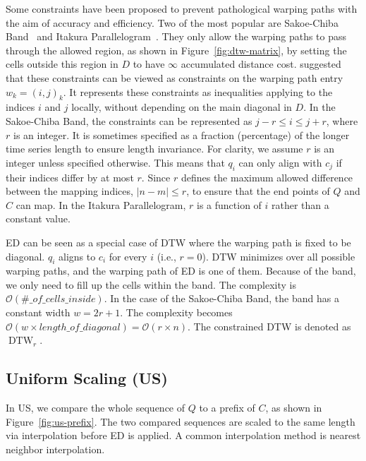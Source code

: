 
Some constraints have been proposed to prevent pathological warping paths with the aim of accuracy and efficiency.
Two of the most popular are Sakoe-Chiba Band~\cite{sakoe1978dynamic} and Itakura Parallelogram~\cite{itakura1975minimum}.
They only allow the warping paths to pass through the allowed region, as shown in Figure~\ref{fig:dtw-matrix}, by setting the cells outside this region in $D$ to have $\infty$ accumulated distance cost.
\cite{keogh2005exact} suggested that these constraints can be viewed as constraints on the warping path entry $w_k = (i,j)_k$.
It represents these constraints as inequalities applying to the indices $i$ and $j$ locally, without depending on the main diagonal in $D$.
In the Sakoe-Chiba Band, the constraints can be represented as $j -r \leq i \leq j+r$, where $r$ is an integer.
It is sometimes specified as a fraction (percentage) of the longer time series length to ensure length invariance.
For clarity, we assume $r$ is an integer unless specified otherwise.
This means that $q_i$ can only align with $c_j$ if their indices differ by at most $r$.
Since $r$ defines the maximum allowed difference between the mapping indices, $|n - m| \leq r$, to ensure that the end points of $Q$ and $C$ can map.
In the Itakura Parallelogram, $r$ is a function of $i$ rather than a constant value.

ED can be seen as a special case of DTW where the warping path is fixed to be diagonal. $q_i$ aligns to $c_i$ for every $i$ (i.e., $r = 0$).
%
DTW minimizes over all possible warping paths, and the warping path of ED is one of them.
Because of the band, we only need to fill up the cells within the band. The complexity is $\mathcal{O}(\#\_of\_cells\_inside)$.
In the case of the Sakoe-Chiba Band, the band has a constant width $w = 2r + 1$.
The complexity becomes $\mathcal{O}(w \times length\_of\_diagonal) = \mathcal{O}(r \times n)$.
The constrained DTW is denoted as $\operatorname{DTW}_r$.

\subsection{Uniform Scaling (US)} %

In US, we compare the whole sequence of $Q$ to a prefix of $C$, as shown in Figure~\ref{fig:us-prefix}.
The two compared sequences are scaled to the same length via interpolation before ED is applied.
A common interpolation method is nearest neighbor interpolation.

